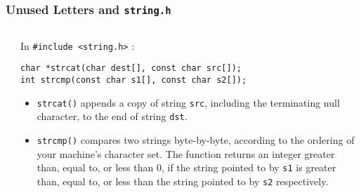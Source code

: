 

\begin{frame}[fragile]
\frametitle{Unused Letters and {\tt string.h}}
\begin{columns}

\begin{column}{0.45\textwidth}

\end{column}

\pause
\begin{column}{0.45\textwidth}
In \verb^#include <string.h>^ :
{\small
\begin{verbatim}
char *strcat(char dest[], const char src[]);
int strcmp(const char s1[], const char s2[]);
\end{verbatim}
}
\begin{itemize}[<+->]
\item \verb^strcat()^ appends a copy of string \verb^src^,
including  the  terminating null character,
to  the  end  of  string  \verb^dst^.
\item \verb^strcmp()^ compares two strings byte-by-byte, according to the
     ordering  of  your  machine's  character  set.  The function
     returns an integer greater than, equal to, or less  than  0,
     if the string pointed to by \verb^s1^ is greater than, equal to, or
     less than the string pointed to by \verb^s2^ respectively.
\end{itemize}
\end{column}

\end{columns}
\end{frame}



